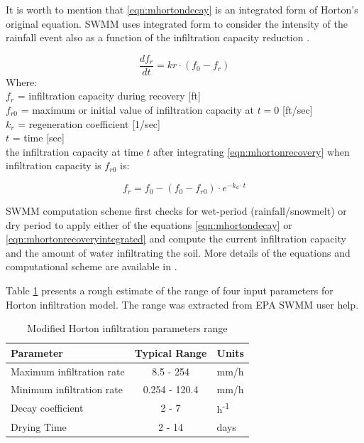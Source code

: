 It is worth to mention that \ref{eqn:mhortondecay} is an integrated form of Horton's original equation. SWMM uses integrated form to consider the intensity of the rainfall event also as a function of the infiltration capacity reduction \cite{Rossman2016}. 


\begin{equation}
\label{eqn:mhortonrecovery}
\frac{df_r}{dt} = kr \cdot (f_0 - f_r) 
\end{equation}
Where: \\

\indent $f_r$ = infiltration capacity during recovery [ft] \\
\indent $f_{r0}$ = maximum or initial value of infiltration capacity at $t = 0$ [ft/sec] \\
\indent $k_r$ = regeneration coefficient [1/sec] \\
\indent $t$ = time [sec] \\

the infiltration capacity at time $t$ after integrating \ref{eqn:mhortonrecovery} when infiltration capacity is $f_{r0}$ is:

\begin{equation}
\label{eqn:mhortonrecoveryintegrated}
f_r =  f_0 - (f_0 - f_{r0}) \cdot e^{-k_d \cdot t}
\end{equation}
    
SWMM computation scheme first checks for wet-period (rainfall/snowmelt) or dry period to apply either of the equations \ref{eqn:mhortondecay} or \ref{eqn:mhortonrecoveryintegrated}  and compute the current infiltration capacity and the amount of water infiltrating the soil. More details of the equations and computational scheme are available in \citet{Rossman2016}.

Table \ref{tbl:infparam} presents a rough estimate of the range of four input parameters for Horton infiltration model. The range was extracted from EPA SWMM user help. 
 

\begin{table}[h]
\caption{Modified Horton infiltration parameters range\cite{Rossman2016}}
\label{tbl:infparam}
\centering
\begin{tabular}{@{}lcll@{}}
\toprule
\textbf{Parameter}        & \multicolumn{2}{c}{\textbf{Typical Range}} & \textbf{Units}        \\ \midrule
Maximum infiltration rate & \multicolumn{2}{c}{8.5 - 254}              & mm/h                  \\
Minimum infiltration rate & \multicolumn{2}{c}{0.254 - 120.4}          & mm/h                  \\
Decay coefficient         & \multicolumn{2}{c}{2 - 7}                  & h\textsuperscript{-1}\\
Drying Time               & \multicolumn{2}{c}{2 - 14}                 & days                  \\ \bottomrule
\end{tabular}
\end{table}



